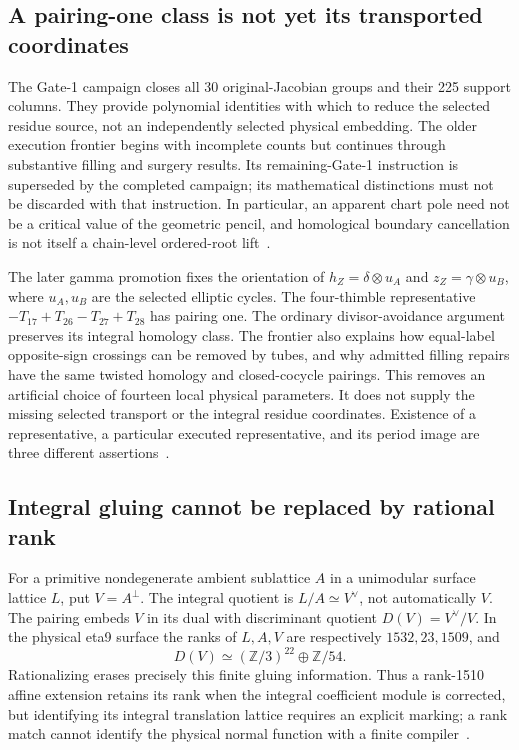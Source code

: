 \documentclass[11pt]{article}
\newcommand{\Z}{\mathbb{Z}}
\theoremstyle{definition}
\theoremstyle{remark}
\begin{document}
\subsection{A pairing-one class is not yet its transported coordinates}
\label{sec:chain-import}

The Gate-1 campaign closes all 30 original-Jacobian groups and their 225
support columns. They provide polynomial identities with which to reduce
the selected residue source, not an independently selected physical
embedding. The older execution frontier begins with incomplete counts
but continues through substantive filling and surgery results. Its
remaining-Gate-1 instruction is superseded by the completed campaign; its
mathematical distinctions must not be discarded with that instruction.
In particular, an apparent chart pole need not be a critical value of the
geometric pencil, and homological boundary cancellation is not itself a
chain-level ordered-root lift~\cite{FluxSource}.

The later gamma promotion fixes the orientation of
\(h_Z=\delta\otimes u_A\) and
\(z_Z=\gamma\otimes u_B\), where \(u_A,u_B\) are the selected elliptic
cycles. The four-thimble representative
\(-T_{17}+T_{26}-T_{27}+T_{28}\) has pairing one. The ordinary
divisor-avoidance argument preserves its integral homology class. The
frontier also explains how equal-label opposite-sign crossings can be
removed by tubes, and why admitted filling repairs have the same twisted
homology and closed-cocycle pairings. This removes an artificial choice
of fourteen local physical parameters. It does not supply the missing
selected transport or the integral residue coordinates. Existence of a
representative, a particular executed representative, and its period image
are three different assertions~\cite{FluxSource}.

\subsection{Integral gluing cannot be replaced by rational rank}
\label{sec:lattice-import}

For a primitive nondegenerate ambient sublattice \(A\) in a unimodular
surface lattice \(L\), put \(V=A^\perp\). The integral quotient is
\(L/A\simeq V^\vee\), not automatically \(V\). The pairing embeds
\(V\) in its dual with discriminant quotient
\(D(V)=V^\vee/V\). In the physical eta9 surface the ranks of
\(L,A,V\) are respectively \(1532,23,1509\), and
\[
 D(V)\simeq(\Z/3)^{22}\oplus\Z/54.
\]
Rationalizing erases precisely this finite gluing information. Thus a
rank-1510 affine extension retains its rank when the integral coefficient
module is corrected, but identifying its integral translation lattice
requires an explicit marking; a rank match cannot identify the physical
normal function with a finite compiler~\cite{FluxIntegral}.
\end{document}
